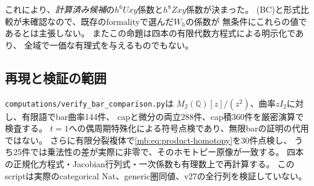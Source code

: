 \begin{remark}[係数の意味]
これにより、\emph{計算済み候補}の$h^6Uxy$係数と$h^8Zxy$係数が決まった。
(BC)と形式比較が未確認なので、既存のformalityで選んだ$W_h$の係数が
無条件にこれらの値であるとは主張しない。
またこの命題は四本の有限代数方程式による明示化であり、
全域で一価な有理式を与えるものでもない。
\end{remark}

\subsection{再現と検証の範囲}
\texttt{computations/verify\_bar\_comparison.py}は
$M_2(\mathbb Q)[z]/(z^2)$、曲率$zI_2$に対し、有限語でbar曲率144件、
capと微分の両立288件、cap積360件を厳密演算で検査する。
$t=1$への偶周期特殊化による符号点検であり、無限barの証明の代用ではない。
さらに有限分裂複体で\eqref{mb:eq:product-homotopy}を30件点検し、
うち25件では乗法性の差が実際に非零で、そのホモトピー原像が一致する。
四本の正規化方程式・Jacobian行列式・一次係数も有理数上で再計算する。
このscriptは実際のcategorical Nat、generic圏同値、v27の全行列を検証していない。
